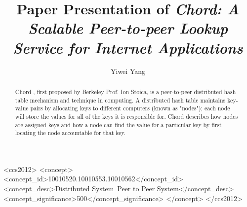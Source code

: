 \documentclass[acmlarge]{acmart}
\begin{document}
\title{Paper Presentation of \textit{Chord: A Scalable Peer-to-peer Lookup Service for Internet Applications}}

\author{Yiwei Yang}

\renewcommand{\shortauthors}{Yiwei Yang}

\begin{abstract}
  Chord \cite{stoica2003chord}, first proposed by Berkeley Prof. Ion Stoica, is a peer-to-peer distributed hash table mechanism and technique in computing. A distributed hash table maintains key-value pairs by allocating keys to different computers (known as "nodes"); each node will store the values for all of the keys it is responsible for. Chord describes how nodes are assigned keys and how a node can find the value for a particular key by first locating the node accountable for that key.
\end{abstract}

\begin{CCSXML}
  <ccs2012>
  <concept>
  <concept_id>10010520.10010553.10010562</concept_id>
  <concept_desc>Distributed System~Peer to Peer System</concept_desc>
  <concept_significance>500</concept_significance>
  </concept>
  </ccs2012>
\end{CCSXML}


\keywords{}
\end{document}
